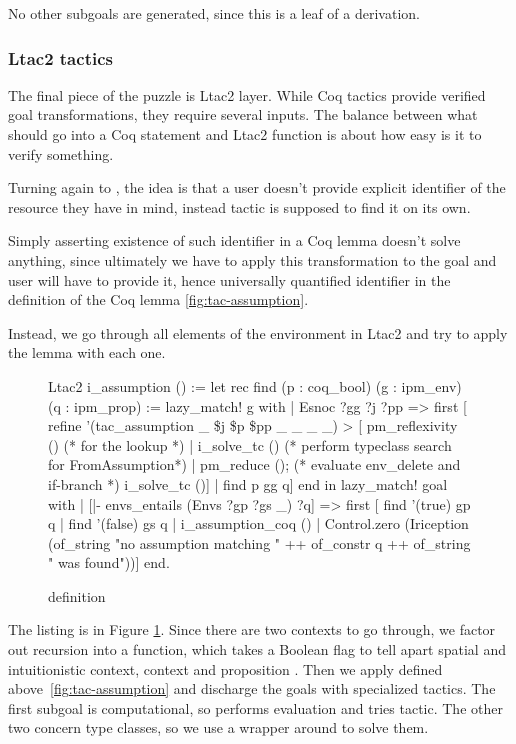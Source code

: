 No other subgoals are generated, since this is a leaf of a derivation.

\subsubsection{Ltac2 tactics}
\label{sec:ltac2-tactics}

The final piece of the puzzle is Ltac2 layer.
While Coq tactics provide verified goal transformations, they require several inputs.
The balance between what should go into a Coq statement and Ltac2 function is about how easy is it to verify something.

Turning again to , the idea is that a user doesn't provide explicit identifier of the resource they have in mind, instead tactic is supposed to find it on its own.

Simply asserting existence of such identifier in a Coq lemma doesn't solve anything, since ultimately we have to apply this transformation to the goal and user will have to provide it, hence universally quantified identifier in the definition of the Coq lemma \ref{fig:tac-assumption}.

Instead, we go through all elements of the environment in Ltac2 and try to apply the lemma with each one.

\begin{figure}
\begin{coq}
Ltac2 i_assumption () :=
  let rec find (p : coq_bool) (g : ipm_env) (q : ipm_prop) :=
      lazy_match! g with
      | Esnoc ?gg ?j ?pp =>
        first [ refine '(tac_assumption _ \$j \$p \$pp _ _ _ _) >
                [ pm_reflexivity () (* for the lookup *)
                | i_solve_tc () (* perform typeclass search for FromAssumption*)
                | pm_reduce (); (* evaluate env_delete and if-branch *)
                  i_solve_tc ()]
              | find p gg q]
      end
  in
  lazy_match! goal with
  | [|- envs_entails (Envs ?gp ?gs _) ?q] =>
     first [ find '(true) gp q
           | find '(false) gs q
           | i_assumption_coq ()
           | Control.zero (Iriception (of_string "no assumption matching " ++
                                       of_constr q ++
                                       of_string " was found"))]
  end.
\end{coq}
\caption{ definition}
\label{fig:i-assumption-def}
\end{figure}

The listing is in Figure \ref{fig:i-assumption-def}.
Since there are two contexts to go through, we factor out recursion into a  function, which takes a Boolean flag  to tell apart spatial and intuitionistic context, context  and proposition .
Then we apply  defined above~\ref{fig:tac-assumption} and discharge the goals with specialized tactics.
The first subgoal  is computational, so  performs evaluation and tries  tactic.
The other two concern type classes, so we use a wrapper around  to solve them.

